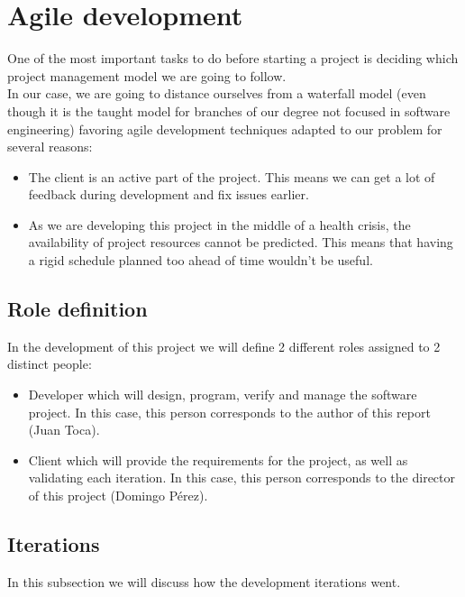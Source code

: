 \section{Agile development}

    One of the most important tasks to do before starting a project is deciding
    which project management model we are going to follow.\\

    In our case, we are going to distance ourselves from a waterfall model
    (even though it is the taught model for branches of our degree not focused
    in software engineering) favoring agile development techniques adapted to
    our problem for several reasons:
    \begin{itemize}
      \item The client is an active part of the project. This means we can get
      a lot of feedback during development and fix issues earlier.
      \item As we are developing this project in the middle of a health crisis,
      the availability of project resources cannot be predicted. This means
      that having a rigid schedule planned too ahead of time wouldn't be
      useful.
    \end{itemize}

    \subsection{Role definition}

    In the development of this project we will define 2 different roles
    assigned to 2 distinct people:
    \begin{itemize}
      \item Developer which will design, program, verify and manage the
      software project. In this case, this person corresponds to the author of
      this report (Juan Toca).
      \item Client which will provide the requirements for the project, as well
      as validating each iteration. In this case, this person corresponds to
      the director of this project (Domingo Pérez).
    \end{itemize}

    \subsection{Iterations}

      In this subsection we will discuss how the development iterations went.\\


